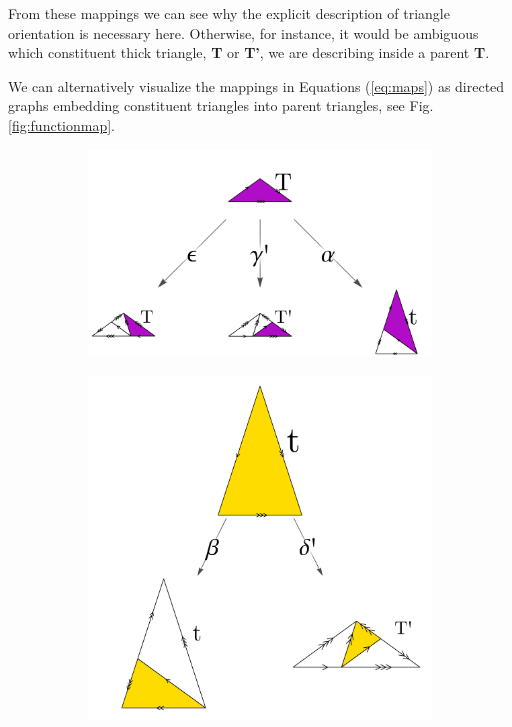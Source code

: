 \documentclass[
  oneside,
  11pt, a4paper,
  footinclude=true,
  headinclude=true,
  cleardoublepage=empty
]{scrbook}
\begin{document}
From these mappings we can see why the explicit description of triangle orientation is necessary here. Otherwise, for instance, it would be ambiguous which constituent thick triangle, \textbf{T} or \textbf{T'}, we are describing inside a parent \textbf{T}.

We can alternatively visualize the mappings in Equations (\ref{eq:maps}) as directed graphs embedding constituent triangles into parent triangles, see Fig.\ref{fig:functionmap}. 

\begin{figure}[H]
        \begin{subfigure}[t]{0.6\textwidth}
                \includegraphics[width=\textwidth]{TRgraph}
        \end{subfigure}\hfill
        \begin{subfigure}[t]{0.4\textwidth}
                \includegraphics[width=\textwidth]{tsrgraph}
        \end{subfigure}\\
        

\end{figure}
\end{document}
